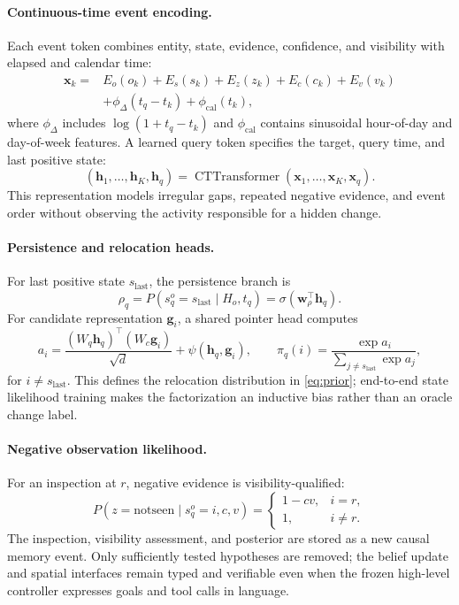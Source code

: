 \paragraph{Continuous-time event encoding.}
Each event token combines entity, state, evidence, confidence, and visibility
with elapsed and calendar time:
\begin{align}
\mathbf x_k={}&E_o(o_k)+E_s(s_k)+E_z(z_k)+E_c(c_k)+E_v(v_k)\nonumber\\
&+\phi_{\Delta}(t_q-t_k)+\phi_{\mathrm{cal}}(t_k),
\label{eq:eventtoken}
\end{align}
where $\phi_{\Delta}$ includes $\log(1+t_q-t_k)$ and
$\phi_{\mathrm{cal}}$ contains sinusoidal hour-of-day and day-of-week features.
A learned query token specifies the target, query time, and last positive state:
\begin{equation}
(\mathbf h_1,\ldots,\mathbf h_K,\mathbf h_q)
=\operatorname{CTTransformer}(\mathbf x_1,\ldots,\mathbf x_K,\mathbf x_q).
\end{equation}
This representation models irregular gaps, repeated negative evidence, and event
order without observing the activity responsible for a hidden change.

\paragraph{Persistence and relocation heads.}
For last positive state $s_{\mathrm{last}}$, the persistence branch is
\begin{equation}
\rho_q=P(s_q^o=s_{\mathrm{last}}\mid H_o,t_q)
=\sigma(\mathbf w_{\rho}^{\top}\mathbf h_q).
\label{eq:persistence}
\end{equation}
For candidate representation $\mathbf g_i$, a shared pointer head computes
\begin{equation}
a_i=\frac{(W_q\mathbf h_q)^\top(W_c\mathbf g_i)}{\sqrt d}
+\psi(\mathbf h_q,\mathbf g_i),\qquad
\pi_q(i)=\frac{\exp a_i}{\sum_{j\neq s_{\mathrm{last}}}\exp a_j},
\label{eq:pointer}
\end{equation}
for $i\neq s_{\mathrm{last}}$. This defines the relocation distribution in
\cref{eq:prior}; end-to-end state likelihood training makes the factorization an
inductive bias rather than an oracle change label.

\paragraph{Negative observation likelihood.}
For an inspection at $r$, negative evidence is visibility-qualified:
\begin{equation}
P(z=\mathrm{notseen}\mid s_q^o=i,c,v)=
\begin{cases}
1-cv, & i=r,\\
1, & i\neq r.
\end{cases}
\label{eq:negative}
\end{equation}
The inspection, visibility assessment, and posterior are stored as a new causal
memory event. Only sufficiently tested hypotheses are removed; the belief update
and spatial interfaces remain typed and verifiable even when the frozen
high-level controller expresses goals and tool calls in language.
